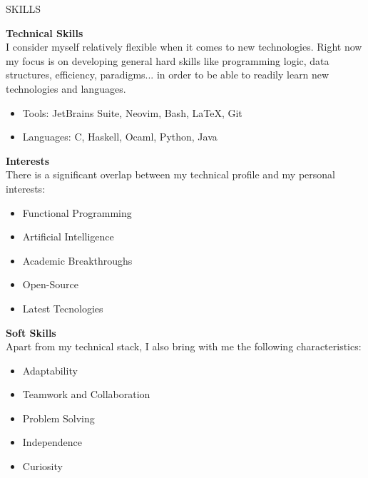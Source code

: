 \documentclass [10pt, a4paper] {extarticle}
\newcommand{\sectionlinethickness}{
    1.3 pt
}
\newcommand{\leftcolumwidth}{
    0.18
}
\newcommand{\rightcolumwidth}{
    0.82
}
\newcommand {\sectiontitle}[1] {
    \begin {flushleft}
    \begin {minipage}[c]{\leftcolumwidth\textwidth}
        \begin {flushright}
        \!\MakeUppercase {#1}
        \hspace* {10px}
        \end {flushright}
    \end {minipage}
        \begin {tikzpicture}
            \hspace{-4px}
            \draw [line width=\sectionlinethickness, namelines] (1,0) -- (15.363,0);
        \end {tikzpicture}
    \end {flushleft}
}
\begin{document}

    \sectiontitle {skills}

    \begin {flushright}
    \begin {minipage} [t] {\rightcolumwidth\textwidth}

        \textbf {Technical Skills} \\ [4px]
        I consider myself relatively flexible when it comes to new technologies. Right now my focus is on developing general hard skills like programming logic, data structures, efficiency, paradigms... in order to be able to readily learn new technologies and languages.
        \vspace {-2px}
        \begin {itemize} [noitemsep]
            \item Tools: JetBrains Suite, Neovim, Bash, LaTeX, Git
            \item Languages: C, Haskell, Ocaml, Python, Java
        \end {itemize}

        \begin {minipage} [t] {0.475\textwidth}
            \textbf {Interests} \\ [4px]
            There is a significant overlap between my technical profile and my personal interests:
            \vspace {-2px}
            \begin {itemize} [noitemsep]
                \item Functional Programming
                \item Artificial Intelligence
                \item Academic Breakthroughs
                \item Open-Source
                \item Latest Tecnologies
            \end {itemize}
        \end {minipage}
        \hfill
        \begin {minipage} [t] {0.475\textwidth}
            \textbf {Soft Skills} \\ [4px]
            Apart from my technical stack, I also bring with me the following characteristics:
            \vspace {-2px}
            \begin {itemize} [noitemsep]
                \item Adaptability
                \item Teamwork and Collaboration
                \item Problem Solving
                \item Independence
                \item Curiosity
            \end {itemize}
        \end {minipage}
    \end {minipage}
    \end {flushright}
\end{document}

